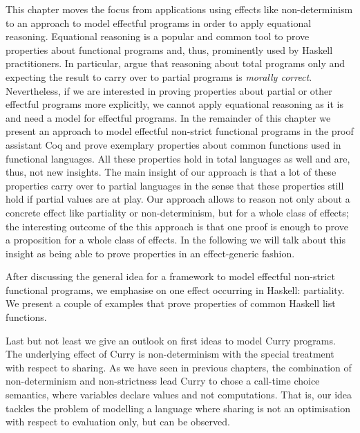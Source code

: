 
This chapter moves the focus from applications using effects like
non-determinism to an approach to model effectful programs in order to
apply equational reasoning.
Equational reasoning is a popular and common tool to prove properties
about functional programs and, thus, prominently used by Haskell
practitioners. 
In particular, \citet{danielsson2006fast} argue that reasoning about
total programs only and expecting the result to carry over to partial
programs is \textit{morally correct}.
Nevertheless, if we are interested in proving properties about partial
or other effectful programs more explicitly, we cannot apply
equational reasoning as it is and need a model for effectful programs.
In the remainder of this chapter we present an approach to model
effectful non-strict functional programs in the proof assistant Coq
and prove exemplary properties about common functions used in
functional languages.
All these properties hold in total languages as well and are, thus,
not new insights.
The main insight of our approach is that a lot of these properties
carry over to partial languages in the sense that these properties
still hold if partial values are at play.
Our approach allows to reason not only about a concrete
effect like partiality or non-determinism, but for a whole class of effects; the
interesting outcome of the this approach is that one proof is
enough to prove a proposition for a whole class of effects.
In the following we will talk about this insight as being able to
prove properties in an effect-generic fashion.

After discussing the general idea for a framework to model effectful
non-strict functional programs, we emphasise on one effect occurring
in Haskell: partiality.
We present a couple of examples that prove properties of common Haskell list
functions.

Last but not least we give an outlook on first ideas to model Curry
programs.
The underlying effect of Curry is non-determinism with the special
treatment with respect to sharing.
As we have seen in previous chapters, the combination of
non-determinism and non-strictness lead Curry to chose a
call-time choice semantics, where variables declare values and not computations.
That is, our idea tackles the problem of modelling a language where
sharing is not an optimisation with respect to evaluation only, but
can be observed.

